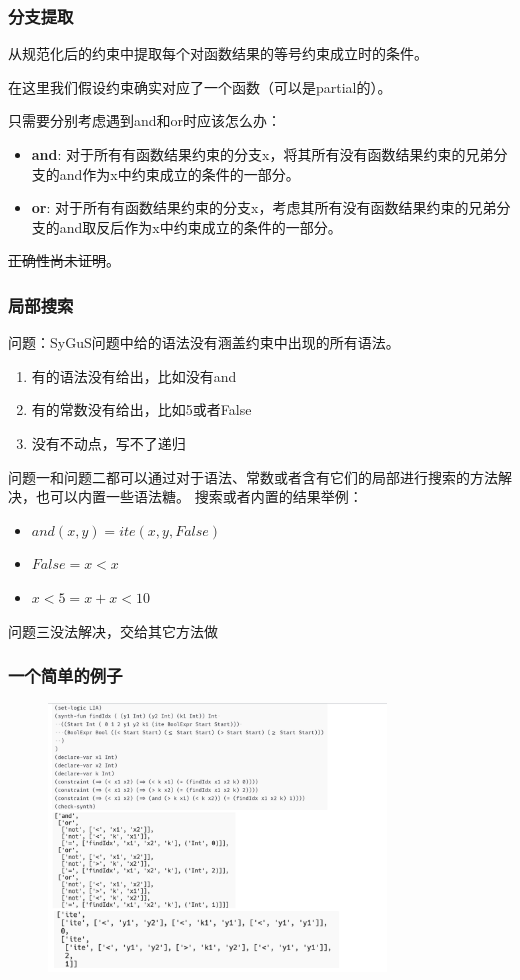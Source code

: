 \documentclass[notheorems]{beamer} %
\begin{document}
  \begin{frame}
    \frametitle{分支提取}
    从规范化后的约束中提取每个对函数结果的等号约束成立时的条件。

    在这里我们假设约束确实对应了一个函数（可以是partial的）。

    只需要分别考虑遇到and和or时应该怎么办：
    \begin{itemize}
      \item \textbf{and}: 对于所有有函数结果约束的分支x，将其所有没有函数结果约束的兄弟分支的and作为x中约束成立的条件的一部分。
      \item \textbf{or}: 对于所有有函数结果约束的分支x，考虑其所有没有函数结果约束的兄弟分支的and取反后作为x中约束成立的条件的一部分。
    \end{itemize}

    \sout{正确性尚未证明}。
  \end{frame}

  \begin{frame}
    \frametitle{局部搜索}
    问题：SyGuS问题中给的语法没有涵盖约束中出现的所有语法。
    \begin{enumerate}
      \item 有的语法没有给出，比如没有and
      \item 有的常数没有给出，比如5或者False
      \item 没有不动点，写不了递归
    \end{enumerate}
    问题一和问题二都可以通过对于语法、常数或者含有它们的局部进行搜索的方法解决，也可以内置一些语法糖。
    搜索或者内置的结果举例：
    \begin{itemize}
      \item $and(x,y)=ite(x,y,False)$
      \item $False = x < x$
      \item $x<5 = x+x < 10$
    \end{itemize}
    问题三没法解决，交给其它方法做
  \end{frame}

  \begin{frame}
    \frametitle{一个简单的例子}
    \begin{figure}
      \centering
      \includegraphics[width=0.8\textwidth]{example.png}
    \end{figure}
  \end{frame}
\end{document}
